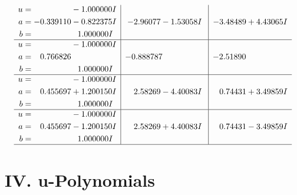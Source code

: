 \documentclass[1p]{elsarticle_modified}
\theoremstyle{definition}
\begin{document}
$$\begin{array}{c|c|c}
\begin{aligned}
u &= \phantom{-0.000000 } -1.000000 I \\
a &= -0.339110 - 0.822375 I \\
b &= \phantom{-0.000000 -}1.000000 I\end{aligned}
 & -2.96077 - 1.53058 I & -3.48489 + 4.43065 I \\ \hline\begin{aligned}
u &= \phantom{-0.000000 } -1.000000 I \\
a &= \phantom{-}0.766826\phantom{ +0.000000I} \\
b &= \phantom{-0.000000 -}1.000000 I\end{aligned}
 & -0.888787\phantom{ +0.000000I} & -2.51890\phantom{ +0.000000I} \\ \hline\begin{aligned}
u &= \phantom{-0.000000 } -1.000000 I \\
a &= \phantom{-}0.455697 + 1.200150 I \\
b &= \phantom{-0.000000 -}1.000000 I\end{aligned}
 & \phantom{-}2.58269 - 4.40083 I & \phantom{-}0.74431 + 3.49859 I \\ \hline\begin{aligned}
u &= \phantom{-0.000000 } -1.000000 I \\
a &= \phantom{-}0.455697 - 1.200150 I \\
b &= \phantom{-0.000000 -}1.000000 I\end{aligned}
 & \phantom{-}2.58269 + 4.40083 I & \phantom{-}0.74431 - 3.49859 I\\
 \hline 
 \end{array}$$\newpage
\newpage\renewcommand{\arraystretch}{1}
\centering \section*{ IV. u-Polynomials}
\end{document}

